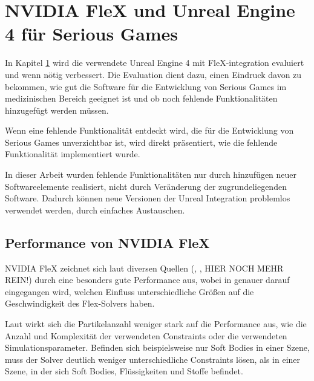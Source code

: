 \chapter{NVIDIA FleX und Unreal Engine 4 für Serious Games}
\label{chap_Flex_Engine}

In Kapitel \ref{chap_Flex_Engine} wird die verwendete Unreal Engine 4 mit FleX-integration evaluiert und wenn nötig verbessert. Die Evaluation dient dazu, einen Eindruck davon zu bekommen, wie gut die Software für die Entwicklung von Serious Games im medizinischen Bereich geeignet ist und ob noch fehlende Funktionalitäten hinzugefügt werden müssen. 

Wenn eine fehlende Funktionalität entdeckt wird, die für die Entwicklung von Serious Games unverzichtbar ist, wird direkt präsentiert, wie die fehlende Funktionalität implementiert wurde.

In dieser Arbeit wurden fehlende Funktionalitäten nur durch hinzufügen neuer Softwareelemente realisiert, nicht durch Veränderung der zugrundeliegenden Software. Dadurch können neue Versionen der Unreal Integration problemlos verwendet werden, durch einfaches Austauschen. 


\section{Performance von NVIDIA FleX}
\label{sec_performance}

NVIDIA FleX zeichnet sich laut diversen Quellen (\cite{FlexD3D}, \cite{UPP}, HIER NOCH MEHR REIN!) durch eine besonders gute Performance aus, wobei in \cite{FlexD3D} genauer darauf eingegangen wird, welchen Einfluss unterschiedliche Größen auf die Geschwindigkeit des Flex-Solvers haben. 

Laut \cite{FlexD3D} wirkt sich die Partikelanzahl weniger stark auf die Performance aus, wie die Anzahl und Komplexität der verwendeten Constraints oder die verwendeten Simulationsparameter. Befinden sich beispielsweise nur Soft Bodies in einer Szene, muss der Solver deutlich weniger unterschiedliche Constraints lösen, als in einer Szene, in der sich Soft Bodies, Flüssigkeiten und Stoffe befindet.

